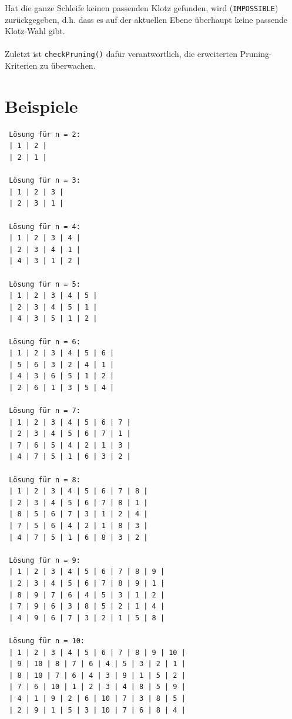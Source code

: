\documentclass[a4paper, notitlepage, 12pt]{scrartcl}
\begin{document}
Hat die ganze Schleife keinen passenden Klotz gefunden, wird (\texttt{IMPOSSIBLE}) zurückgegeben, d.h. dass es auf der aktuellen Ebene überhaupt keine passende Klotz-Wahl gibt.
\\ \\
Zuletzt ist \texttt{checkPruning()} dafür verantwortlich, die erweiterten Pruning-Kriterien zu überwachen.
\newpage
\section{Beispiele}
 \begin{multicols}{2}
 \begin{verbatim}
 Lösung für n = 2: 
 | 1 | 2 | 
 | 2 | 1 |
 
 Lösung für n = 3:
 | 1 | 2 | 3 | 
 | 2 | 3 | 1 |
 
 Lösung für n = 4: 
 | 1 | 2 | 3 | 4 | 
 | 2 | 3 | 4 | 1 | 
 | 4 | 3 | 1 | 2 |
 
 Lösung für n = 5: 
 | 1 | 2 | 3 | 4 | 5 | 
 | 2 | 3 | 4 | 5 | 1 | 
 | 4 | 3 | 5 | 1 | 2 |
 
 Lösung für n = 6: 
 | 1 | 2 | 3 | 4 | 5 | 6 | 
 | 5 | 6 | 3 | 2 | 4 | 1 | 
 | 4 | 3 | 6 | 5 | 1 | 2 | 
 | 2 | 6 | 1 | 3 | 5 | 4 |
 
 Lösung für n = 7:
 | 1 | 2 | 3 | 4 | 5 | 6 | 7 | 
 | 2 | 3 | 4 | 5 | 6 | 7 | 1 | 
 | 7 | 6 | 5 | 4 | 2 | 1 | 3 | 
 | 4 | 7 | 5 | 1 | 6 | 3 | 2 | 
 
 Lösung für n = 8:
 | 1 | 2 | 3 | 4 | 5 | 6 | 7 | 8 | 
 | 2 | 3 | 4 | 5 | 6 | 7 | 8 | 1 | 
 | 8 | 5 | 6 | 7 | 3 | 1 | 2 | 4 | 
 | 7 | 5 | 6 | 4 | 2 | 1 | 8 | 3 | 
 | 4 | 7 | 5 | 1 | 6 | 8 | 3 | 2 | 
 
 Lösung für n = 9:
 | 1 | 2 | 3 | 4 | 5 | 6 | 7 | 8 | 9 | 
 | 2 | 3 | 4 | 5 | 6 | 7 | 8 | 9 | 1 | 
 | 8 | 9 | 7 | 6 | 4 | 5 | 3 | 1 | 2 | 
 | 7 | 9 | 6 | 3 | 8 | 5 | 2 | 1 | 4 | 
 | 4 | 9 | 6 | 7 | 3 | 2 | 1 | 5 | 8 | 
 
 Lösung für n = 10:
 | 1 | 2 | 3 | 4 | 5 | 6 | 7 | 8 | 9 | 10 | 
 | 9 | 10 | 8 | 7 | 6 | 4 | 5 | 3 | 2 | 1 | 
 | 8 | 10 | 7 | 6 | 4 | 3 | 9 | 1 | 5 | 2 | 
 | 7 | 6 | 10 | 1 | 2 | 3 | 4 | 8 | 5 | 9 | 
 | 4 | 1 | 9 | 2 | 6 | 10 | 7 | 3 | 8 | 5 | 
 | 2 | 9 | 1 | 5 | 3 | 10 | 7 | 6 | 8 | 4 | 
 \end{verbatim}
 \end{multicols}
\end{document}

